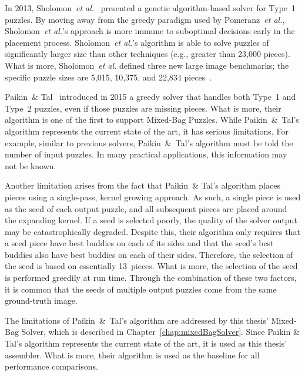 In 2013, Sholomon~\textit{et al.}~\cite{sholomon2013} presented a genetic algorithm-based solver for Type~1 puzzles.  By moving away from the greedy paradigm used by Pomeranz~\textit{et al.}, Sholomon~\textit{et al.}'s approach is more immune to suboptimal decisions early in the placement process. Sholomon~\textit{et al.}'s algorithm is able to solve puzzles of significantly larger size than other techniques (e.g., greater than 23,000 pieces).  What is more, Sholomon~\textit{et al.} defined three new large image benchmarks; the specific puzzle sizes are 5,015, 10,375, and 22,834 pieces~\cite{sholomonBenchmarkImages}.

Paikin~\& Tal~\cite{paikin2015} introduced in 2015 a greedy solver that handles both Type~1 and Type~2 puzzles, even if those puzzles are missing pieces.  What is more, their algorithm is one of the first to support Mixed-Bag Puzzles.  While Paikin~\&~Tal's algorithm represents the current state of the art, it has serious limitations.  For example, similar to previous solvers, Paikin~\&~Tal's algorithm must be told the number of input puzzles.  In many practical applications, this information may not be known.

Another limitation arises from the fact that Paikin~\& Tal's algorithm places pieces using a single-pass, kernel growing approach.  As such, a single piece is used as the seed of each output puzzle, and all subsequent pieces are placed around the expanding kernel.  If a seed is selected poorly, the quality of the solver output may be catastrophically degraded.  Despite this, their algorithm only requires that a seed piece have best buddies on each of its sides and that the seed's best buddies also have best buddies on each of their sides.  Therefore, the selection of the seed is based on essentially 13~pieces.  What is more, the selection of the seed is performed greedily at run time.  Through the combination of these two factors, it is common that the seeds of multiple output puzzles come from the same ground-truth image.

The limitations of Paikin~\&~Tal's algorithm are addressed by this thesis' Mixed-Bag Solver, which is described in Chapter~\ref{chap:mixedBagSolver}.  Since Paikin \&  Tal's algorithm represents the current state of the art, it is used as this thesis' assembler.  What is more, their algorithm is used as the baseline for all performance comparisons. 